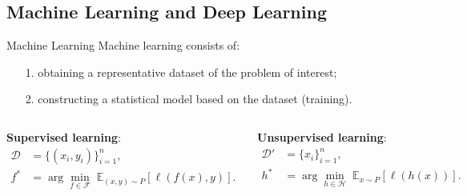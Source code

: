 \documentclass[aspectratio=169,xcolor=dvipsnames]{beamer}
\begin{document}


\subsection{Machine Learning and Deep Learning}
\begin{frame}{Machine Learning}
    Machine learning consists of:
    \begin{itemize}
        \item[1.] obtaining a representative dataset of the problem of interest;
        \item[2.] constructing a statistical model based on the dataset (training).
    \end{itemize}

    \begin{columns}[c]
        {\small
            \textbf{Supervised learning}:
            \begin{align*}
                \mathcal{D} & = \{(x_i, y_i)\}_{i=1}^n,                                                 \\
                f^*         & = \arg\min_{f \in \mathcal{F}} \; \mathbb{E}_{(x,y)\sim P}[\ell(f(x),y)].
            \end{align*}

            \textbf{Unsupervised learning}:
            \begin{align*}
                \mathcal{D}' & = \{x_i\}_{i=1}^n,                                                  \\
                h^*          & = \arg\min_{h \in \mathcal{H}} \; \mathbb{E}_{x\sim P}[\ell(h(x))].
            \end{align*}
        }


\end{columns}
\end{frame}
\end{document}
